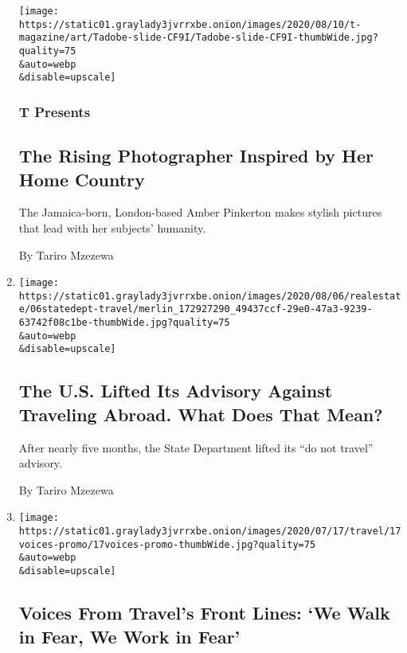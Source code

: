 \begin{enumerate}
  \texttt{[image: https://static01.graylady3jvrrxbe.onion/images/2020/08/10/t-magazine/art/Tadobe-slide-CF9I/Tadobe-slide-CF9I-thumbWide.jpg?quality=75\\\&auto=webp\\\&disable=upscale]}

  \hypertarget{t-presents}{%
  \subsubsection{T Presents}\label{t-presents}}

  \hypertarget{the-rising-photographer-inspired-by-her-home-country}{%
  \subsection{The Rising Photographer Inspired by Her Home
  Country}\label{the-rising-photographer-inspired-by-her-home-country}}

  The Jamaica-born, London-based Amber Pinkerton makes stylish pictures
  that lead with her subjects' humanity.

  By Tariro Mzezewa
\item
  \href{/2020/08/06/travel/USA-Travel-State-Department-warnings.html}{}

  \texttt{[image: https://static01.graylady3jvrrxbe.onion/images/2020/08/06/realestate/06statedept-travel/merlin\_172927290\_49437ccf-29e0-47a3-9239-63742f08c1be-thumbWide.jpg?quality=75\\\&auto=webp\\\&disable=upscale]}

  \hypertarget{the-us-lifted-its-advisory-against-traveling-abroad-what-does-that-mean}{%
  \subsection{The U.S. Lifted Its Advisory Against Traveling Abroad.
  What Does That
  Mean?}\label{the-us-lifted-its-advisory-against-traveling-abroad-what-does-that-mean}}

  After nearly five months, the State Department lifted its ``do not
  travel'' advisory.

  By Tariro Mzezewa
\item
  \href{/2020/07/17/travel/coronavirus-travel-hospitality-workers.html}{}

  \texttt{[image: https://static01.graylady3jvrrxbe.onion/images/2020/07/17/travel/17voices-promo/17voices-promo-thumbWide.jpg?quality=75\\\&auto=webp\\\&disable=upscale]}

  \hypertarget{voices-from-travels-front-lines-we-walk-in-fear-we-work-in-fear}{%
  \subsection{Voices From Travel's Front Lines: `We Walk in Fear, We
  Work in
  Fear'}\label{voices-from-travels-front-lines-we-walk-in-fear-we-work-in-fear}}


\end{enumerate}
